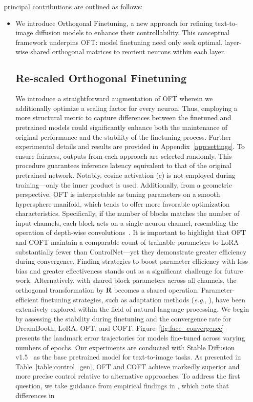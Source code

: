 \begin{itemize}[leftmargin=*,nosep]
principal contributions are outlined as follows:

\begin{itemize}[leftmargin=*,nosep]

    \item We introduce Orthogonal Finetuning, a new approach for refining text-to-image diffusion models to enhance their controllability. This conceptual framework underpins OFT: model finetuning need only seek optimal, layer-wise shared orthogonal matrices to reorient neurons within each layer. \subsection{Re-scaled Orthogonal Finetuning}

We introduce a straightforward augmentation of OFT wherein we additionally optimize a scaling factor for every neuron. Thus, employing a more structural metric to capture differences between the finetuned and pretrained models could significantly enhance both the maintenance of original performance and the stability of the finetuning process. Further experimental details and results are provided in Appendix~\ref{app:settings}. To ensure fairness, outputs from each approach are selected randomly. This procedure guarantees inference latency equivalent to that of the original pretrained network. Notably, cosine activation (c) is not employed during training—only the inner product is used. Additionally, from a geometric perspective, OFT is interpretable as tuning parameters on a smooth hypersphere manifold, which tends to offer more favorable optimization characteristics. Specifically, if the number of blocks matches the number of input channels, each block acts on a single neuron channel, resembling the operation of depth-wise convolutions~\cite{chollet2017xception}. It is important to highlight that OFT and COFT maintain a comparable count of trainable parameters to LoRA—substantially fewer than ControlNet—yet they demonstrate greater efficiency during convergence. Finding strategies to boost parameter efficiency with less bias and greater effectiveness stands out as a significant challenge for future work. Alternatively, with shared block parameters across all channels, the orthogonal transformation by $\bm{R}$ becomes a shared operation. Parameter-efficient finetuning strategies, such as adaptation methods (\emph{e.g.}, \cite{hulora2022,houlsby2019parameter,pfeiffer2020adapterfusion}), have been extensively explored within the field of natural language processing. We begin by assessing the stability during finetuning and the convergence rate for DreamBooth, LoRA, OFT, and COFT. Figure~\ref{fig:face_convergence} presents the landmark error trajectories for models fine-tuned across varying numbers of epochs. Our experiments are conducted with Stable Diffusion v1.5~\cite{rombach2022high} as the base pretrained model for text-to-image tasks. As presented in Table~\ref{table:control_gen}, OFT and COFT achieve markedly superior and more precise control relative to alternative approaches. To address the first question, we take guidance from empirical findings in \cite{liu2018decoupled,chen2020angular}, which note that differences in 
\end{itemize}
\end{itemize}
